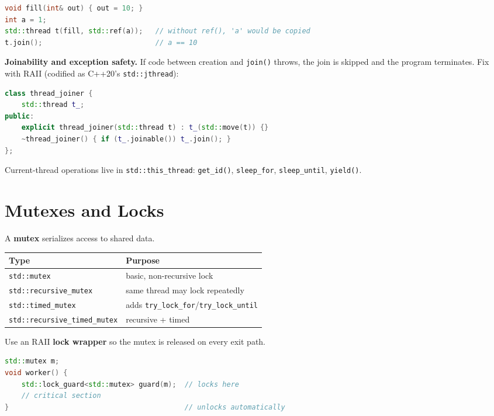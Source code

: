 \begin{lstlisting}[language=C++, caption={passing by reference requires std::ref}]
void fill(int& out) { out = 10; }
int a = 1;
std::thread t(fill, std::ref(a));   // without ref(), 'a' would be copied
t.join();                           // a == 10
\end{lstlisting}

\textbf{Joinability and exception safety.} If code between creation and \texttt{join()} throws, the join is skipped and the program terminates. Fix with RAII (codified as C++20's \texttt{std::jthread}):

\begin{lstlisting}[language=C++, caption={an RAII thread joiner (exception-safe)}]
class thread_joiner {
    std::thread t_;
public:
    explicit thread_joiner(std::thread t) : t_(std::move(t)) {}
    ~thread_joiner() { if (t_.joinable()) t_.join(); }
};
\end{lstlisting}

Current-thread operations live in \texttt{std::this\_thread}: \texttt{get\_id()}, \texttt{sleep\_for}, \texttt{sleep\_until}, \texttt{yield()}.

\section{Mutexes and Locks}

A \textbf{mutex} serializes access to shared data.

\begin{center}
\begin{tabular}{|l|l|}
\hline \textbf{Type} & \textbf{Purpose} \\ \hline
\texttt{std::mutex}                 & basic, non-recursive lock \\
\texttt{std::recursive\_mutex}      & same thread may lock repeatedly \\
\texttt{std::timed\_mutex}          & adds \texttt{try\_lock\_for}/\texttt{try\_lock\_until} \\
\texttt{std::recursive\_timed\_mutex} & recursive + timed \\
\hline
\end{tabular}
\end{center}

Use an RAII \textbf{lock wrapper} so the mutex is released on every exit path.

\begin{lstlisting}[language=C++, caption={lock\_guard locks for the full scope}]
std::mutex m;
void worker() {
    std::lock_guard<std::mutex> guard(m);  // locks here
    // critical section
}                                          // unlocks automatically
\end{lstlisting}

